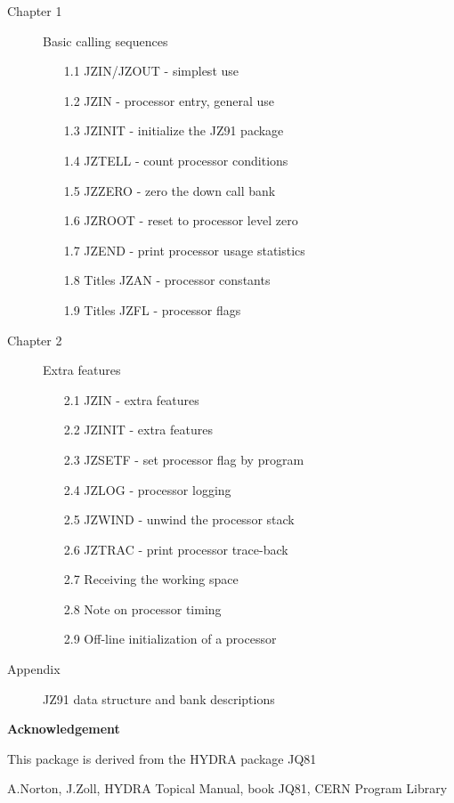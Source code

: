 \begin{description}
  \in{30mm}
  \item[Chapter 1] Basic calling sequences
  \begin{itemize}
     \in{30mm}
     \item[1.1] JZIN/JZOUT - simplest use
     \item[1.2] JZIN   - processor entry, general use
     \item[1.3] JZINIT - initialize the JZ91 package
     \item[1.4] JZTELL - count processor conditions
     \item[1.5] JZZERO - zero the down call bank
     \item[1.6] JZROOT - reset to processor level zero
     \item[1.7] JZEND  - print processor usage statistics
     \item[1.8] Titles JZAN - processor constants
     \item[1.9] Titles JZFL - processor flags
  \end{itemize}
  \item[Chapter 2] Extra features
  \begin{itemize}
     \in{30mm}
     \item[2.1] JZIN   - extra features
     \item[2.2] JZINIT - extra features
     \item[2.3] JZSETF - set processor flag by program
     \item[2.4] JZLOG - processor logging
     \item[2.5] JZWIND - unwind the processor stack
     \item[2.6] JZTRAC - print processor trace-back
     \item[2.7] Receiving the working space
     \item[2.8] Note on processor timing
     \item[2.9] Off-line initialization of a processor
  \end{itemize}
  \item[Appendix] JZ91 data structure and bank descriptions
\end{description}
\newpage
\lile{4mm}
\vspace*{40pt}
{\large\bf Acknowledgement} \vspace{4mm}

This package is derived from the HYDRA package JQ81

A.Norton, J.Zoll, HYDRA Topical Manual, book JQ81, CERN Program Library

